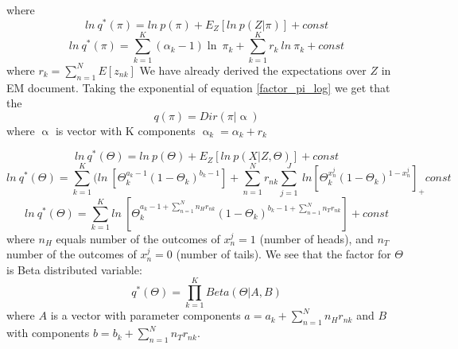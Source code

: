 \documentclass{article}
\newcommand\ProdK{\prod_{k=1}^{K}}
\newcommand\SumK{\sum_{k=1}^{K}}
\newcommand\SumN{\sum_{n=1}^{N}}
\newcommand\SumJ{\sum_{j=1}^{J}}
\begin{document}
where
\begin{equation}
    ln\:q^*(\pi) = ln\:p(\pi) + E_{Z}[ln\:p(Z|\pi)] + const
\end{equation}
\begin{equation}\label{factor_pi_log}
    ln\:q^*(\pi) = \SumK{(\alpha_k-1)\ln\:\pi_k} + \SumK r_k\:ln\:\pi_k+ const
\end{equation}
where $r_{k} = \SumN E[z_{nk}]$
We have already derived the expectations over $Z$ in EM document.
Taking the exponential of equation \ref{factor_pi_log} we get that the 
\begin{equation}
    q(\pi) = Dir(\pi| \upalpha)
\end{equation}
where $\upalpha$ is vector with K components $\upalpha_k = \alpha_k+r_k$

\begin{equation}
    ln\:q^*(\Theta) = ln\:p(\Theta) + E_Z[ln\:p(X|Z,\Theta)] + const
\end{equation}
\begin{equation}
    ln\:q^*(\Theta) = \SumK (ln\:[\Theta_k^{a_k-1}(1-\Theta_k)^{b_k-1}] + \SumN r_{nk}\SumJ \:ln[\Theta_k^{x_n^j}(1-\Theta_k)^{1-x_n^j}]_ + const
\end{equation}
\begin{equation}
    ln\:q^*(\Theta) = \SumK ln\:[\Theta_k^{a_k-1+\SumN n_Hr_{nk}}(1-\Theta_k)^{b_k-1+\SumN n_Tr_{nk}}] + const
\end{equation}
where $n_H$ equals number of the outcomes of $x_n^j = 1$ (number of heads), and $n_T$ number of the outcomes of $x_n^j = 0$ (number of tails).
We see that the factor for $\Theta$ is Beta distributed variable:
\begin{equation}
    q^*(\Theta) = \ProdK Beta(\Theta|A, B)
\end{equation}
where $A$ is a vector with parameter components $a = a_{k}+\SumN n_Hr_{nk}$ and $B$ with components $b = b_{k}+\SumN n_Tr_{nk}$.
\end{document}
